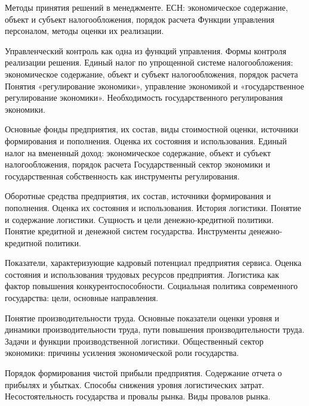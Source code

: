 \documentclass[
	11pt,
	a4paper,
	]
	{article}
\begin{document}
\bigskip

\noindent{} 
	{
		Методы принятия решений в менеджменте.
	}{
		ЕСН: экономическое содержание, объект и субъект налогообложения, порядок расчета
	}{
		Функции управления персоналом, методы оценки их реализации.
	}

\bigskip

\noindent{} 
	{
		Управленческий контроль как одна из функций управления. Формы контроля реализации решения.
	}{
		Единый налог по упрощенной системе налогообложения: экономическое содержание, объект и субъект налогообложения, порядок расчета
	}{
		Понятия «регулирование экономики», управление экономикой и «государственное регулирование экономики». Необходимость государственного регулирования экономики.
	}

\bigskip

\noindent{} 
	{
		Основные фонды предприятия, их состав, виды стоимостной оценки, источники формирования и пополнения. Оценка их состояния и использования.
	}{
		Единый налог на вмененный доход: экономическое содержание, объект и субъект налогообложения, порядок расчета
	}{
		Государственный сектор экономики и государственная собственность как инструменты регулирования.
	}

\bigskip

\noindent{} 
	{
		Оборотные средства предприятия, их состав, источники формирования и пополнения. Оценка их состояния и использования.
	}{
		История логистики. Понятие и содержание логистики.
	}{
		Сущность и цели денежно-кредитной политики. Понятие кредитной и денежной систем государства. Инструменты денежно-кредитной политики.
	}

\bigskip

\noindent{} 
	{
		Показатели, характеризующие кадровый потенциал предприятия сервиса. Оценка состояния и использования трудовых ресурсов предприятия.
	}{
		Логистика как фактор повышения конкурентоспособности.
	}{
		Социальная политика современного государства: цели, основные направления.
	}

\bigskip

\noindent{} 
	{
		Понятие производительности труда. Основные показатели оценки уровня и динамики производительности труда, пути повышения производительности труда.
	}{
		Задачи и функции производственной логистики.
	}{
		Общественный сектор экономики: причины усиления экономической роли государства.
	}

\bigskip

\noindent{} 
	{
		Порядок формирования чистой прибыли предприятия. Содержание отчета о прибылях и убытках.
	}{
		Способы снижения уровня логистических затрат.
	}{
		Несостоятельность государства и провалы рынка. Виды провалов рынка.
	}
\end{document}
